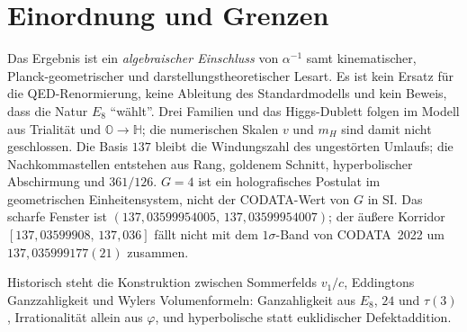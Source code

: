 \documentclass[11pt,a4paper]{article}
\begin{document}
\section{Einordnung und Grenzen}

Das Ergebnis ist ein \emph{algebraischer Einschluss} von $\alpha^{-1}$ samt kinematischer, Planck-geometrischer und darstellungstheoretischer Lesart.
Es ist kein Ersatz für die QED-Renormierung, keine Ableitung des Standardmodells und kein Beweis, dass die Natur $E_8$ ``wählt''.
Drei Familien und das Higgs-Dublett folgen im Modell aus Trialität und $\mathbb{O}\to\mathbb{H}$; die numerischen Skalen $v$ und $m_H$ sind damit nicht geschlossen.
Die Basis $137$ bleibt die Windungszahl des ungestörten Umlaufs; die Nachkommastellen entstehen aus Rang, goldenem Schnitt, hyperbolischer Abschirmung und $361/126$.
$G=4$ ist ein holografisches Postulat im geometrischen Einheitensystem, nicht der CODATA-Wert von $G$ in SI.
Das scharfe Fenster ist $(137{,}03599954005,\,137{,}03599954007)$;
der äußere Korridor $[137{,}03599908,\,137{,}036]$ fällt nicht mit dem $1\sigma$-Band von CODATA~2022 um $137{,}035999177(21)$ zusammen.

Historisch steht die Konstruktion zwischen Sommerfelds $v_1/c$, Eddingtons Ganzzahligkeit und Wylers Volumenformeln:
Ganzahligkeit aus $E_8$, $24$ und $\tau(3)$, Irrationalität allein aus $\varphi$, und hyperbolische statt euklidischer Defektaddition.
\end{document}
